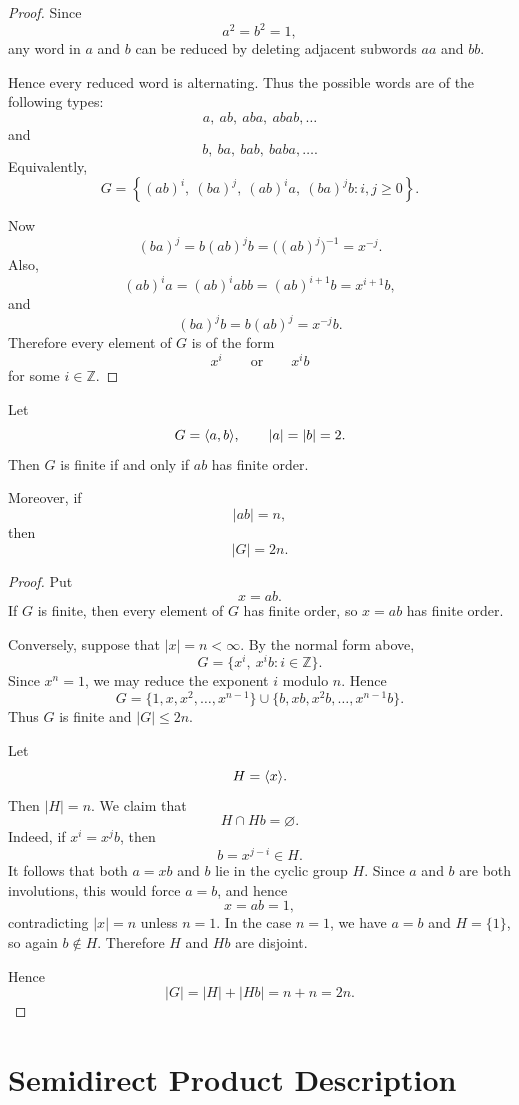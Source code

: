 \begin{proof}
Since
\[
    a^2=b^2=1,
\]
any word in $a$ and $b$ can be reduced by deleting adjacent subwords $aa$ and $bb$.

Hence every reduced word is alternating. Thus the possible words are of the following types:
\[
    a,\ ab,\ aba,\ abab,\ldots
\]
and
\[
    b,\ ba,\ bab,\ baba,\ldots .
\]
Equivalently,
\[
    G=
    \left\{
        (ab)^i,\ (ba)^j,\ (ab)^i a,\ (ba)^j b
        : i,j\geq 0
    \right\}.
\]

Now
\[
    (ba)^j
    =
    b(ab)^j b
    =
    \bigl((ab)^j\bigr)^{-1}
    =
    x^{-j}.
\]
Also,
\[
    (ab)^i a
    =
    (ab)^i a b b
    =
    (ab)^{i+1}b
    =
    x^{i+1}b,
\]
and
\[
    (ba)^j b
    =
    b(ab)^j
    =
    x^{-j}b.
\]
Therefore every element of $G$ is of the form
\[
    x^i
    \qquad\text{or}\qquad
    x^i b
\]
for some $i\in\mathbb Z$.
\end{proof}

\begin{theorem}
Let
\[
    G=\langle a,b\rangle,
    \qquad
    |a|=|b|=2.
\]
Then $G$ is finite if and only if $ab$ has finite order.

Moreover, if
\[
    |ab|=n,
\]
then
\[
    |G|=2n.
\]
\end{theorem}

\begin{proof}
Put
\[
    x=ab.
\]
If $G$ is finite, then every element of $G$ has finite order, so $x=ab$ has finite order.

Conversely, suppose that $|x|=n<\infty$. By the normal form above,
\[
    G=\{x^i,\ x^i b: i\in\mathbb Z\}.
\]
Since $x^n=1$, we may reduce the exponent $i$ modulo $n$. Hence
\[
    G=
    \{1,x,x^2,\ldots,x^{n-1}\}
    \cup
    \{b,xb,x^2b,\ldots,x^{n-1}b\}.
\]
Thus $G$ is finite and $|G|\leq 2n$.

Let
\[
    H=\langle x\rangle.
\]
Then $|H|=n$. We claim that
\[
    H\cap Hb=\varnothing.
\]
Indeed, if $x^i=x^j b$, then
\[
    b=x^{j-i}\in H.
\]
It follows that both $a=xb$ and $b$ lie in the cyclic group $H$. Since $a$ and $b$ are both involutions, this would force $a=b$, and hence
\[
    x=ab=1,
\]
contradicting $|x|=n$ unless $n=1$. In the case $n=1$, we have $a=b$ and $H=\{1\}$, so again $b\notin H$. Therefore $H$ and $Hb$ are disjoint.

Hence
\[
    |G|=|H|+|Hb|=n+n=2n.
\]
\end{proof}

\section{Semidirect Product Description}

